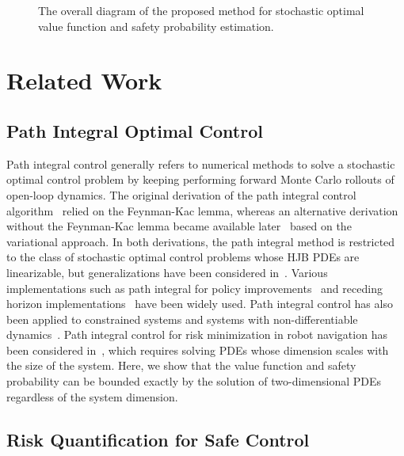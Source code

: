 \documentclass[letterpaper]{article} %
\newcommand{\resolved}[1]{}
\begin{document}
\begin{figure}
    \centering
    
    \caption{The overall diagram of the proposed method for stochastic optimal value function and safety probability estimation. \resolved{remove task x.x and replace with content in this paper}
    }
    \label{fig:overall_diagram}
\end{figure}







\section{Related Work}
\label{sec:related_work}
\subsection{Path Integral Optimal Control}
 Path integral control generally refers to numerical methods to solve a stochastic optimal control problem by keeping performing forward Monte Carlo rollouts of open-loop dynamics. The original derivation of the path integral control algorithm~\cite{kappen2005path} relied on the Feynman-Kac lemma, whereas an alternative derivation without the Feynman-Kac lemma became available later~\cite{theodorou2012relative} based on the variational approach. In both derivations, the path integral method is restricted to the class of stochastic optimal control problems whose HJB PDEs are linearizable, but generalizations have been considered in~\cite{satoh2016iterative,williams2017information}. Various implementations such as path integral for policy improvements~\cite{theodorou2010generalized} and receding horizon implementations~\cite{williams2017model} have been widely used. Path integral control has also been applied to constrained systems and systems with non-differentiable dynamics~\cite{satoh2020nonlinear,carius2022constrained}. Path integral control for risk minimization in robot navigation has been considered in~\cite{patil2022chance}, which requires solving PDEs whose dimension scales with the size of the system. Here, we show that the value function and safety probability can be bounded exactly by the solution of two-dimensional PDEs regardless of the system dimension.




\subsection{Risk Quantification for Safe Control}
\resolved{similar topic but alternative objectives, or just cite related safe control papers}
\resolved{add more recent papers on risk quantification}
\end{document}
